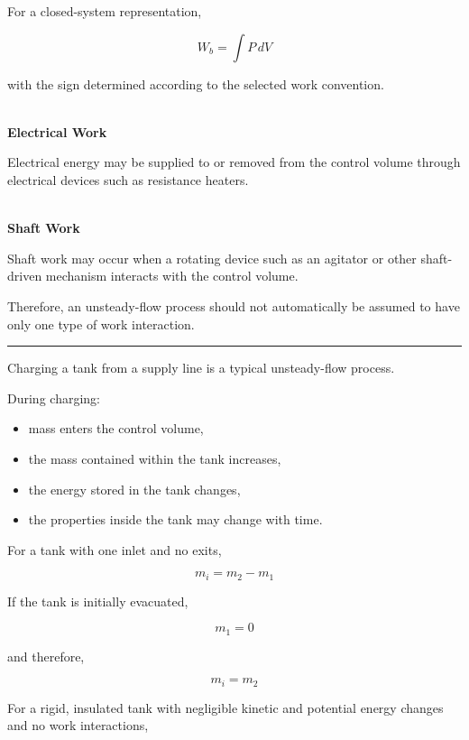 \documentclass[12pt]{article}
\newcommand{\mysubsection}[2]{%
    \vspace{5px}
    \noindent{\headingfont\large #1\space #2\par}
    \vspace{4pt}
    \hrule
    \vspace{15pt}
}
\begin{document}
For a closed-system representation,

\begin{equation}
W_b
=
\int P\,dV
\end{equation}

with the sign determined according to the selected work convention.

\textbf{\\ Electrical Work}

Electrical energy may be supplied to or removed from the control volume through electrical devices such as resistance heaters.

\textbf{\\ Shaft Work}

Shaft work may occur when a rotating device such as an agitator or other shaft-driven mechanism interacts with the control volume.

Therefore, an unsteady-flow process should not automatically be assumed to have only one type of work interaction.

\mysubsection{}{Charging of a Rigid Tank}

Charging a tank from a supply line is a typical unsteady-flow process.

During charging:

\begin{itemize}
    \item mass enters the control volume,
    \item the mass contained within the tank increases,
    \item the energy stored in the tank changes,
    \item the properties inside the tank may change with time.
\end{itemize}

For a tank with one inlet and no exits,

\begin{equation}
m_i=m_2-m_1
\end{equation}

If the tank is initially evacuated,

\begin{equation}
m_1=0
\end{equation}

and therefore,

\begin{equation}
m_i=m_2
\end{equation}

For a rigid, insulated tank with negligible kinetic and potential energy changes and no work interactions,
\end{document}
